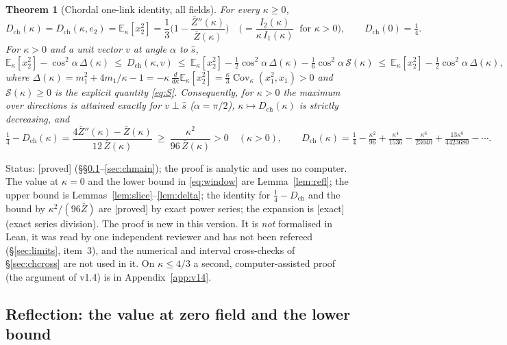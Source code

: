 \documentclass[11pt,a4paper]{article}
\newtheorem{theorem}{Theorem}
\theoremstyle{remark}
\theoremstyle{definition}
\theoremstyle{plain}
\theoremstyle{remark}
\newcommand{\E}{\mathbb{E}}
\newcommand{\Cov}{\operatorname{Cov}}
\newcommand{\st}[1]{\textsf{[#1]}}
\newcommand{\Zb}{\bar Z}
\newcommand{\Dch}{D_{\mathrm{ch}}}
\begin{document}
\begin{theorem}[Chordal one-link identity, all fields]\label{thm:chordal}
For every $\kappa\ge0$,
\[
\Dch(\kappa)=\Dch(\kappa,e_2)=\E_\kappa[x_2^2]=\frac13\Big(1-\frac{\Zb''(\kappa)}{\Zb(\kappa)}\Big)
\quad\Big(=\frac{I_2(\kappa)}{\kappa\,I_1(\kappa)}\ \text{ for }\kappa>0\Big),\qquad \Dch(0)=\tfrac14 .
\]
For $\kappa>0$ and a unit vector $v$ at angle $\alpha$ to $\hat s$,
\begin{equation}\label{eq:window}
\E_\kappa[x_2^2]-\cos^2\!\alpha\,\Delta(\kappa)\ \le\ \Dch(\kappa,v)\ \le\
\E_\kappa[x_2^2]-\tfrac12\cos^2\!\alpha\,\Delta(\kappa)-\tfrac16\cos^2\!\alpha\,\mathcal S(\kappa)\ \le\
\E_\kappa[x_2^2]-\tfrac12\cos^2\!\alpha\,\Delta(\kappa),
\end{equation}
where $\Delta(\kappa)=m_1^2+4m_1/\kappa-1=-\kappa\,\frac{d}{d\kappa}\E_\kappa[x_2^2]=\frac\kappa3\Cov_\kappa(x_1^2,x_1)>0$
and $\mathcal S(\kappa)\ge0$ is the explicit quantity \eqref{eq:S}.
Consequently, for $\kappa>0$ the maximum over directions is attained exactly for $v\perp\hat s$ ($\alpha=\pi/2$),
$\kappa\mapsto\Dch(\kappa)$ is strictly decreasing, and
\[
\tfrac14-\Dch(\kappa)=\frac{4\Zb''(\kappa)-\Zb(\kappa)}{12\,\Zb(\kappa)}\ \ge\ \frac{\kappa^2}{96\,\Zb(\kappa)}>0\quad(\kappa>0),\qquad
\Dch(\kappa)=\tfrac14-\tfrac{\kappa^2}{96}+\tfrac{\kappa^4}{1536}-\tfrac{\kappa^6}{23040}+\tfrac{13\kappa^8}{4423680}-\cdots .
\]
\end{theorem}
\noindent Status: \st{proved} (\S\S\ref{sec:chrefl}--\ref{sec:chmain}); the proof is analytic and uses no computer. The value at $\kappa=0$ and
the lower bound in \eqref{eq:window} are Lemma~\ref{lem:refl}; the upper bound is Lemmas~\ref{lem:slice}--\ref{lem:delta}; the identity for
$\frac14-\Dch$ and the bound by $\kappa^2/(96\Zb)$ are \st{proved} by exact power series; the expansion is \st{exact} (exact series division).
The proof is new in this version. It is \emph{not} formalised in Lean, it was read by one independent reviewer and has not been refereed
(\S\ref{sec:limits}, item~3), and the numerical and interval cross-checks of \S\ref{sec:chcross} are not used in it. On $\kappa\le4/3$ a second,
computer-assisted proof (the argument of v1.4) is in Appendix~\ref{app:v14}.

\subsection{Reflection: the value at zero field and the lower bound}\label{sec:chrefl}
\end{document}
